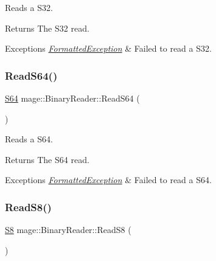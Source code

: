 Reads a {\ttfamily S32}.

\begin{DoxyReturn}{Returns}
The {\ttfamily S32} read. 
\end{DoxyReturn}

\begin{DoxyExceptions}{Exceptions}
{\em \hyperlink{structmage_1_1_formatted_exception}{Formatted\+Exception}} & Failed to read a {\ttfamily S32}. \\
\hline
\end{DoxyExceptions}
\hypertarget{classmage_1_1_binary_reader_a287d4d14b7990e1b88f9b913a39d09df}{}\label{classmage_1_1_binary_reader_a287d4d14b7990e1b88f9b913a39d09df} 
\subsubsection{\texorpdfstring{Read\+S64()}{ReadS64()}}
{\footnotesize\ttfamily \hyperlink{namespacemage_a38d4d411c173c8978eb356d2412b32dd}{S64} mage\+::\+Binary\+Reader\+::\+Read\+S64 (\begin{DoxyParamCaption}{ }\end{DoxyParamCaption})\hspace{0.3cm}{\ttfamily [protected]}}

Reads a {\ttfamily S64}.

\begin{DoxyReturn}{Returns}
The {\ttfamily S64} read. 
\end{DoxyReturn}

\begin{DoxyExceptions}{Exceptions}
{\em \hyperlink{structmage_1_1_formatted_exception}{Formatted\+Exception}} & Failed to read a {\ttfamily S64}. \\
\hline
\end{DoxyExceptions}
\hypertarget{classmage_1_1_binary_reader_af1628266b77efcb4e55589af90b522da}{}\label{classmage_1_1_binary_reader_af1628266b77efcb4e55589af90b522da} 
\subsubsection{\texorpdfstring{Read\+S8()}{ReadS8()}}
{\footnotesize\ttfamily \hyperlink{namespacemage_a20766a773cfd6c14d8f2344d4631b89c}{S8} mage\+::\+Binary\+Reader\+::\+Read\+S8 (\begin{DoxyParamCaption}{ }\end{DoxyParamCaption})\hspace{0.3cm}{\ttfamily [protected]}}

